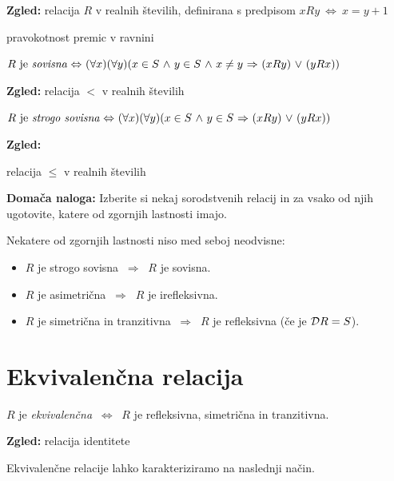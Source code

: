 \documentclass[11pt,paper=b5,footinclude,headinclude]{scrbook} %
\def\ali {{~\vee~}}
\def\inn {{~\wedge~}}
\def\sledi {{~\Rightarrow~}}
\def\cee {{~\Leftrightarrow~}}
\begin{document}

\textbf{ Zgled:}
relacija $R$ v realnih številih, definirana s predpisom $xRy \cee x = y + 1$

pravokotnost premic v ravnini

\bigskip

$R \textrm{ je {\em sovisna}} \cee (\forall x)(\forall y)(x\in S\inn y\in S
\inn x\neq y\sledi (xRy)\ali (yRx))$


\textbf{ Zgled:}
relacija $<$ v realnih  številih

\bigskip

$R \textrm{ je {\em strogo sovisna}} \cee (\forall x)(\forall y)(x\in S\inn y\in S
\sledi (xRy)\ali (yRx))$


\textbf{ Zgled:}

relacija $\le$ v realnih številih

\bigskip
\textbf{ Domača naloga:}
Izberite si nekaj sorodstvenih relacij in za vsako od njih ugotovite, katere od zgornjih lastnosti imajo.

\bigskip
Nekatere od zgornjih lastnosti niso med seboj neodvisne:
\begin{itemize}
  \item $R$ je strogo sovisna $\sledi$ $R$ je sovisna.
  \item $R$ je asimetrična $\sledi$ $R$ je irefleksivna.
  \item $R$ je simetrična in tranzitivna $\sledi$ $R$ je refleksivna (če je ${\cal D}R = S$).
\end{itemize}

\section{Ekvivalenčna relacija}

$R$ je {\em ekvivalenčna} $\cee$ $R$ je refleksivna, simetrična in tranzitivna.

\textbf{ Zgled:} relacija identitete

\bigskip
Ekvivalenčne relacije lahko karakteriziramo na naslednji način.
\end{document}

